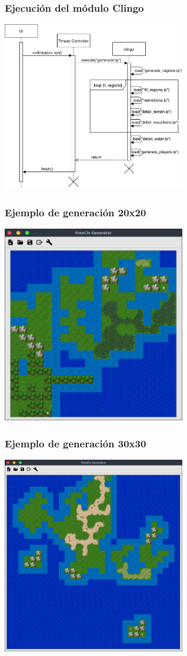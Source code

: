 \documentclass[10pt]{beamer}
\begin{document}
	\begin{frame}
	\frametitle{Ejecución del módulo Clingo}
	
	\centering
	\includegraphics[width=0.6\textwidth]{images/diagrama-secuencia.pdf}
	
	\end{frame}

	\begin{frame}
	\frametitle{Ejemplo de generación 20x20}
	
	\centering
	\includegraphics[width=0.6\textwidth]{images/ejemplo-20-20.png}
	
	\end{frame}

	\begin{frame}
	\frametitle{Ejemplo de generación 30x30}
	
	\centering
	\includegraphics[width=0.6\textwidth]{images/ejemplo-30-30.png}
	
	\end{frame}
\end{document}

